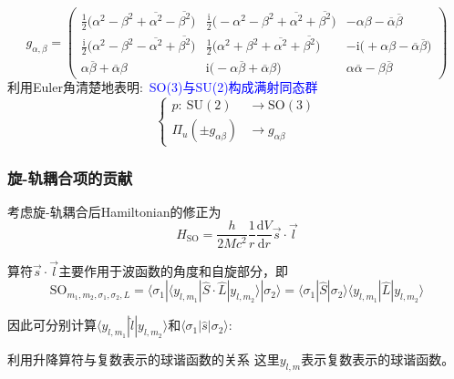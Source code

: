 {{{\begin{displaymath}
	g_{\alpha,\beta}=
	\begin{pmatrix}
		\frac12\big(\alpha^2-\beta^2+\overline{\alpha^2}-\overline{\beta^2}\big) &\frac{\mathrm{i}}2\big(-\alpha^2-\beta^2+\overline{\alpha^2}+\overline{\beta^2}\big) &-\alpha\beta-\overline{\alpha}\overline{\beta}\\
		\frac{\mathrm{i}}2\big(\alpha^2-\beta^2-\overline{\alpha^2}+\overline{\beta^2}\big) &\frac12\big(\alpha^2+\beta^2+\overline{\alpha^2}+\overline{\beta^2}\big) &-\mathrm{i}\big(+\alpha\beta-\overline{\alpha}\overline{\beta}\big)\\
		\alpha\overline{\beta}+\overline{\alpha}\beta &\mathrm{i}\big(-\alpha\overline{\beta}+\overline{\alpha}\beta\big) &\alpha\overline{\alpha}-\beta\overline{\beta}
	\end{pmatrix}
\end{displaymath}
利用\textrm{Euler}角清楚地表明:~\textcolor{blue}{\textrm{SO(3)}与\textrm{SU(2)}构成满射同态群}
\begin{displaymath}
	\left\{
		\begin{aligned}
			p:~\mathrm{SU(2)}&\rightarrow \mathrm{SO(3)}\\
			\Pi_u(\pm g_{\alpha\beta})&\rightarrow g_{\alpha\beta}
		\end{aligned}
		\right.
\end{displaymath}
}}
}

\frame
{
	\frametitle{旋-轨耦合项的贡献}
	考虑旋-轨耦合后\textrm{Hamiltonian}的修正为
	\begin{displaymath}
		H_{\mathrm{SO}}=\dfrac{h}{2Mc^2}\dfrac1{r}\dfrac{\mathrm{d}V}{\mathrm{d}r}\vec{s}\cdot\vec{l}
	\end{displaymath}

	算符$\vec{s}\cdot\vec{l}$主要作用于波函数的角度和自旋部分，即
\begin{displaymath}
	\mathrm{SO}_{m_1,m_2,\sigma_1,\sigma_2,L}=\langle\sigma_1|\langle y_{l,m_1}|\hat S\cdot\hat L|y_{l,m_2}\rangle|\sigma_2\rangle=\langle\sigma_1|\hat S|\sigma_2\rangle\langle y_{l,m_1}|\hat L|y_{l,m_2}\rangle
\end{displaymath}

因此可分别计算$\langle y_{l,m_1}|\hat l|y_{l,m_2}\rangle$和$\langle\sigma_1|\hat s|\sigma_2\rangle$:

利用升降算符与复数表示的球谐函数的关系
	{	\fontsize{8.2pt}{4.2pt}}
这里$y_{l,m}$表示复数表示的球谐函数。

}

